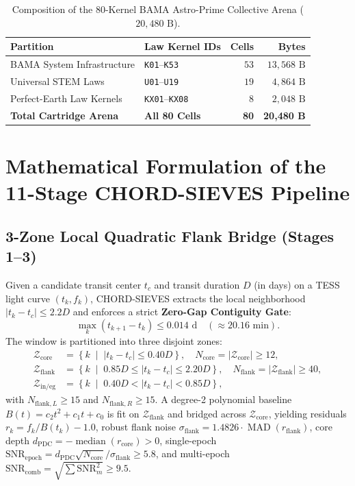 \documentclass[10pt,twocolumn]{article}
\begin{document}
\begin{table}[t]
\centering
\caption{Composition of the 80-Kernel BAMA Astro-Prime Collective Arena ($20{,}480\text{ B}$).}
\label{tab:arena}
\footnotesize
\begin{tabular}{@{}llrr@{}}
\toprule
\textbf{Partition} & \textbf{Law Kernel IDs} & \textbf{Cells} & \textbf{Bytes} \\
\midrule
BAMA System Infrastructure & \texttt{K01}--\texttt{K53} & $53$ & $13{,}568\text{ B}$ \\
Universal STEM Laws & \texttt{U01}--\texttt{U19} & $19$ & $4{,}864\text{ B}$ \\
Perfect-Earth Law Kernels & \texttt{KX01}--\texttt{KX08} & $8$ & $2{,}048\text{ B}$ \\
\midrule
\textbf{Total Cartridge Arena} & \textbf{All 80 Cells} & \textbf{80} & \textbf{20,480 B} \\
\bottomrule
\end{tabular}
\end{table}

\section{Mathematical Formulation of the 11-Stage CHORD-SIEVES Pipeline}
\subsection{3-Zone Local Quadratic Flank Bridge (Stages 1--3)}
Given a candidate transit center $t_c$ and transit duration $D$ (in days) on a TESS light curve $(t_k, f_k)$, CHORD-SIEVES extracts the local neighborhood $\lvert t_k - t_c \rvert \le 2.2 D$ and enforces a strict \textbf{Zero-Gap Contiguity Gate}:
\begin{equation}
  \max_{k} \left(t_{k+1} - t_k\right) \le 0.014\text{ d} \quad (\approx 20.16\text{ min}).
\end{equation}
The window is partitioned into three disjoint zones:
\begin{align}
  \mathcal{Z}_{\text{core}} &= \left\{ k \;\middle|\; \lvert t_k - t_c \rvert \le 0.40 D \right\}, \quad N_{\text{core}} = \lvert \mathcal{Z}_{\text{core}} \rvert \ge 12, \\
  \mathcal{Z}_{\text{flank}} &= \left\{ k \;\middle|\; 0.85 D \le \lvert t_k - t_c \rvert \le 2.20 D \right\}, \quad N_{\text{flank}} = \lvert \mathcal{Z}_{\text{flank}} \rvert \ge 40, \\
  \mathcal{Z}_{\text{in/eg}} &= \left\{ k \;\middle|\; 0.40 D < \lvert t_k - t_c \rvert < 0.85 D \right\},
\end{align}
with $N_{\text{flank},L} \ge 15$ and $N_{\text{flank},R} \ge 15$. A degree-2 polynomial baseline $B(t) = c_2 t^2 + c_1 t + c_0$ is fit on $\mathcal{Z}_{\text{flank}}$ and bridged across $\mathcal{Z}_{\text{core}}$, yielding residuals $r_k = f_k / B(t_k) - 1.0$, robust flank noise $\sigma_{\text{flank}} = 1.4826 \cdot \operatorname{MAD}(r_{\text{flank}})$, core depth $d_{\text{PDC}} = -\operatorname{median}(r_{\text{core}}) > 0$, single-epoch $\text{SNR}_{\text{epoch}} = d_{\text{PDC}}\sqrt{N_{\text{core}}}/\sigma_{\text{flank}} \ge 5.8$, and multi-epoch $\text{SNR}_{\text{comb}} = \sqrt{\sum \text{SNR}_m^2} \ge 9.5$.
\end{document}
